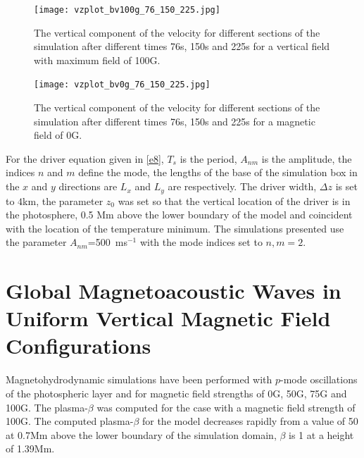 \documentclass[physics,article,submit,pdftex,moreauthors]{Definitions/mdpi}
\begin{document}
\begin{figure}\label{vzplot_bv100g_76_150_225}
\texttt{[image: vzplot\_bv100g\_76\_150\_225.jpg]}
\caption{The vertical component of the velocity for different sections of the simulation after different times 76s, 150s and 225s for a vertical field with maximum field of 100G.}
\end{figure}



\begin{figure}\label{vzplot_bv0g_76_150_225}
\texttt{[image: vzplot\_bv0g\_76\_150\_225.jpg]}
\caption{The vertical component of the velocity for different sections of the simulation after different times 76s, 150s and 225s for a magnetic field of 0G.}
\end{figure}





For the driver equation given in \ref{e8}, $T_{s}$ is the period, $A_{nm}$ is the amplitude, the indices $n$ and $m$ define the mode, the lengths of the base of the simulation box in the $x$ and $y$ directions are $L_{x}$ and $L_{y}$ are  respectively. The driver width, $\Delta z$ is set to $4$km, the parameter $z_{0}$ was set so that the vertical location of the driver is in the photosphere, 0.5 Mm above the lower boundary of the model and coincident with the location of the temperature minimum. The simulations presented use the parameter $A_{nm}$=500\, ms$^{-1}$ with the mode indices set to $n,m=2$. 


\section{Global Magnetoacoustic Waves in Uniform Vertical Magnetic Field Configurations}

Magnetohydrodynamic simulations have been performed with $p$-mode oscillations of the photospheric layer and for magnetic field strengths of 0G, 50G, 75G and 100G. The plasma-$\beta$ was computed for the case with a magnetic field strength of 100G. The computed plasma-$\beta$ for the model decreases rapidly from a value of 50 at 0.7Mm above the lower boundary of the simulation domain, $\beta$ is 1 at a height of 1.39Mm.  
\end{document}
